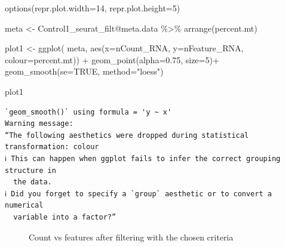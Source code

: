 \documentclass[
  letterpaper,
  DIV=11,
  numbers=noendperiod]{scrartcl}
\newenvironment{Shaded}{}{}
\newcommand{\AttributeTok}[1]{\textcolor[rgb]{0.49,0.56,0.16}{#1}}
\newcommand{\ConstantTok}[1]{\textcolor[rgb]{0.53,0.00,0.00}{#1}}
\newcommand{\DecValTok}[1]{\textcolor[rgb]{0.25,0.63,0.44}{#1}}
\newcommand{\FloatTok}[1]{\textcolor[rgb]{0.25,0.63,0.44}{#1}}
\newcommand{\FunctionTok}[1]{\textcolor[rgb]{0.02,0.16,0.49}{#1}}
\newcommand{\NormalTok}[1]{#1}
\newcommand{\OtherTok}[1]{\textcolor[rgb]{0.00,0.44,0.13}{#1}}
\newcommand{\SpecialCharTok}[1]{\textcolor[rgb]{0.25,0.44,0.63}{#1}}
\newcommand{\StringTok}[1]{\textcolor[rgb]{0.25,0.44,0.63}{#1}}
\begin{document}
\begin{Shaded}
\begin{Highlighting}[]
\FunctionTok{options}\NormalTok{(}\AttributeTok{repr.plot.width=}\DecValTok{14}\NormalTok{, }\AttributeTok{repr.plot.height=}\DecValTok{5}\NormalTok{)}

\NormalTok{meta }\OtherTok{\textless{}{-}}\NormalTok{ Control1\_seurat\_filt}\SpecialCharTok{@}\NormalTok{meta.data }\SpecialCharTok{\%\textgreater{}\%} \FunctionTok{arrange}\NormalTok{(percent.mt)}

\NormalTok{plot1 }\OtherTok{\textless{}{-}} \FunctionTok{ggplot}\NormalTok{( meta, }\FunctionTok{aes}\NormalTok{(}\AttributeTok{x=}\NormalTok{nCount\_RNA, }\AttributeTok{y=}\NormalTok{nFeature\_RNA, }\AttributeTok{colour=}\NormalTok{percent.mt)) }\SpecialCharTok{+} 
         \FunctionTok{geom\_point}\NormalTok{(}\AttributeTok{alpha=}\FloatTok{0.75}\NormalTok{, }\AttributeTok{size=}\DecValTok{5}\NormalTok{)}\SpecialCharTok{+}
         \FunctionTok{geom\_smooth}\NormalTok{(}\AttributeTok{se=}\ConstantTok{TRUE}\NormalTok{, }\AttributeTok{method=}\StringTok{"loess"}\NormalTok{)}

\NormalTok{plot1}
\end{Highlighting}
\end{Shaded}

\begin{verbatim}
`geom_smooth()` using formula = 'y ~ x'
Warning message:
“The following aesthetics were dropped during statistical transformation: colour
ℹ This can happen when ggplot fails to infer the correct grouping structure in
  the data.
ℹ Did you forget to specify a `group` aesthetic or to convert a numerical
  variable into a factor?”
\end{verbatim}

\begin{figure}[H]


\caption{\label{fig-filtrelationship}Count vs features after filtering
with the chosen criteria}

\end{figure}%
\end{document}

